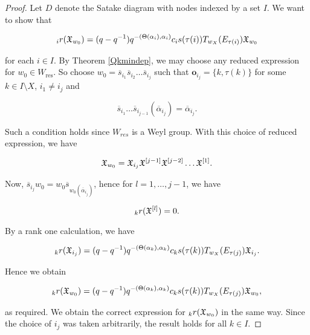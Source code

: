 \documentclass[a4 paper, 10pt]{article}
\begin{document}
\begin{proof}

Let $D$ denote the Satake diagram with nodes indexed by a set $I$. We want to show that

\begin{equation*}
	{}_{i}r(\mathfrak{X}_{w_0}) = (q-q^{-1})q^{-(\Theta(\alpha_i),\alpha_i)}c_is(\tau(i))T_{w_X}(E_{\tau(i)})\mathfrak{X}_{w_0}
\end{equation*}

\noindent for each $i \in I$. By Theorem \ref{Qkmindep}, we may choose any reduced expression for $w_0 \in W_{\text{res}}$. So choose $w_0 = \overline{s}_{i_1}\overline{s}_{i_2} \dots \overline{s}_{i_j}$ such that $\textbf{o}_{i_j} = \{k, \tau(k) \}$ for some $k \in I \setminus X$, $i_1 \neq i_j$ and

\begin{equation*}
 \overline{s}_{i_1} \dots \overline{s}_{i_{j-1}}(\overline{\alpha}_{i_j}) = \overline{\alpha}_{i_j}.
\end{equation*}

\vspace{5pt}
\noindent Such a condition holds since $W_{res}$ is a Weyl group. With this choice of reduced expression, we have

\begin{equation*}
\mathfrak{X}_{w_0} = \mathfrak{X}_{i_j}\mathfrak{X}^{[{j-1}]}\mathfrak{X}^{[{j-2}]} \dots \mathfrak{X}^{[1]}.
\end{equation*}

\vspace{5pt}
\noindent Now, $\overline{s}_{i_j}w_0 = w_0\overline{s}_{w_0(\overline{\alpha}_{i_j})}$, hence for $l = 1, \dots, j-1$, we have \cite[Eqn. $(4)$]{b-Jantzen96}

\begin{equation*}
{}_{k}r(\mathfrak{X}^{[l]}) = 0.
\end{equation*}

\vspace{5pt}
\noindent By a rank one calculation, we have

\begin{equation*}
{}_{k}r(\mathfrak{X}_{i_j}) = (q-q^{-1})q^{-(\Theta(\alpha_k), \alpha_k)}c_ks(\tau(k))T_{w_X}(E_{\tau(j)})\mathfrak{X}_{i_j}.
\end{equation*}


\noindent Hence we obtain

\begin{equation*}
{}_{k}r(\mathfrak{X}_{w_0}) = (q-q^{-1})q^{-(\Theta(\alpha_k),\alpha_k)}c_ks(\tau(k))T_{w_X}(E_{\tau(j)})\mathfrak{X}_{w_0},
\end{equation*}

\vspace{5pt}
\noindent as required. We obtain the correct expression for ${}_{k}r(\mathfrak{X}_{w_0})$ in the same way. Since the choice of $i_j$ was taken arbitrarily, the result holds for all $k \in I$.

\end{proof}


\end{document}
